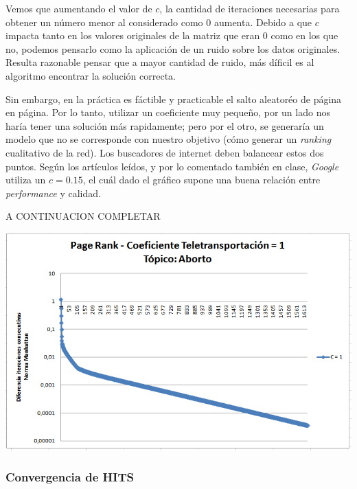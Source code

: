 	Vemos que aumentando el valor de $c$, la cantidad de iteraciones necesarias para obtener un número menor al considerado como $0$ aumenta. Debido a que $c$ impacta tanto en los valores originales de la matriz que eran $0$ como en los que no, podemos pensarlo como la aplicación de un ruido sobre los datos originales. Resulta razonable pensar que a mayor cantidad de ruido, más díficil es al algoritmo encontrar la solución correcta.

	Sin embargo, en la práctica es fáctible y practicable el salto aleatoréo de página en página. Por lo tanto, utilizar un coeficiente muy pequeño, por un lado nos haría tener una solución más rapidamente; pero por el otro, se generaría un modelo que no se corresponde con nuestro objetivo (cómo generar un \textit{ranking} cualitativo de la red). Los buscadores de internet deben balancear estos dos puntos. Según los artículos leídos, y por lo comentado también en clase, \textit{Google} utiliza un $c = 0.15$, el cuál dado el gráfico supone una buena relación entre \textit{performance} y calidad. 

	A CONTINUACION COMPLETAR

	\par 
	\begin{center}
		\includegraphics[scale=0.75]{./img/page_rank_variacion_coef_teletransportacion_1.png}
	\end{center}
	
	\par 

\subsubsection{Convergencia de HITS}

